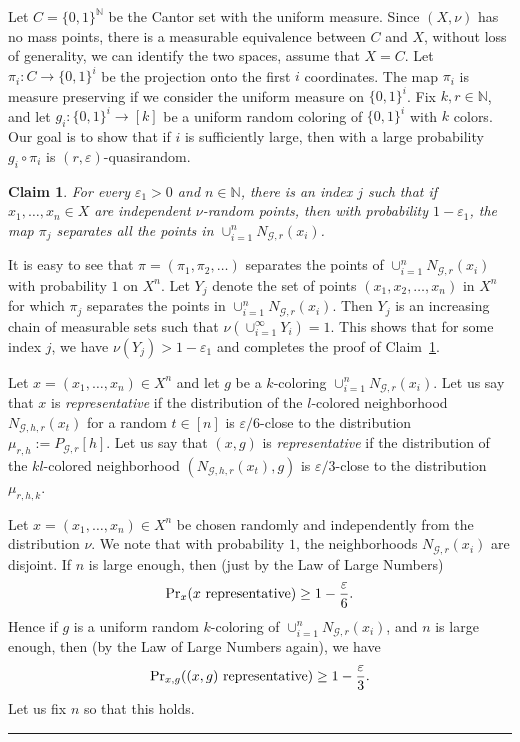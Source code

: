 \documentclass{article}
\newtheorem{claim}{Claim}
\newenvironment{proof}{{\bf Proof.}}{\hfill\rule{2mm}{2mm}\medskip}
\def\GG{\mathcal{G}}\def\HH{\mathcal{H}}\def\II{\mathcal{I}}
\def\eps{\varepsilon}
\def\Pr {{\rm Pr}}
\begin{document}
\begin{proof}
Let $C=\{0,1\}^\mathbb{N}$ be the Cantor set with the uniform
measure. Since $(X,\nu)$ has no mass points, there is a measurable
equivalence between $C$ and $X$, without loss of generality, we can
identify the two spaces, assume that $X=C$. Let
$\pi_i:C\rightarrow\{0,1\}^i$ be the projection onto the first $i$
coordinates. The map $\pi_i$ is measure preserving if we consider the
uniform measure on $\{0,1\}^i$. Fix $k,r\in\mathbb{N}$, and let
$g_i:\{0,1\}^i\rightarrow [k]$ be a uniform random coloring of
$\{0,1\}^i$ with $k$ colors. Our goal is to show that if $i$ is
sufficiently large, then with a large probability $g_i\circ\pi_i$ is
$(r,\eps)$-quasirandom.

\begin{claim}\label{CLAIM:QRAND}
For every $\eps_1>0$ and $n\in\mathbb{N}$, there is an index $j$ such
that if $x_1,\dots,x_n\in X$ are independent $\nu$-random points,
then with probability $1-\eps_1$, the map $\pi_j$ separates all the
points in $\cup_{i=1}^n N_{\GG,r}(x_i)$.
\end{claim}

It is easy to see that $\pi=(\pi_1,\pi_2,\dots)$ separates the points
of $\cup_{i=1}^nN_{\GG,r}(x_i)$ with probability {$1$} on $X^n$. Let
$Y_j$ denote the set of points $(x_1,x_2,\dots,x_n)$ in $X^n$ for
which $\pi_j$ separates the points in $\cup_{i=1}^n N_{\GG,r}(x_i)$.
{Then} $Y_j$ is an increasing chain of measurable sets such that
$\nu(\cup_{i=1}^\infty Y_i)=1$. This shows that for some index $j$,
we have $\nu(Y_j)>1-\eps_1$ and {completes} the proof of
Claim~\ref{CLAIM:QRAND}.

\smallskip

Let $x=(x_1,\dots,x_n)\in X^n$ and let $g$ be a $k$-coloring
$\cup_{i=1}^n N_{\GG,r}(x_i)$. Let us say that $x$ is \emph{representative} if
the
distribution of the $l$-colored neighborhood $N_{\GG,h,r}(x_t)$ for a
random $t\in[n]$ is $\eps/6$-close to the distribution $\mu_{r,h} :=
P_{\GG,r}[h]$.
Let us say that $(x,g)$ is \emph{representative} if the distribution
of the $kl$-colored neighborhood $(N_{\GG,h,r}(x_t),g)$ is
$\eps/3$-close to the distribution $\mu_{r,h,k}$.

Let $x=(x_1,\dots,x_n)\in X^n$ be chosen randomly and independently
from the distribution $\nu$. We note that with probability $1$, the
neighborhoods $N_{\GG,r}(x_i)$ are disjoint. If $n$ is large enough,
then (just by the Law of Large Numbers)
\[
\Pr_x(x~\text{representative})\ge 1-\frac\eps6.
\]
Hence if $g$ is a uniform random $k$-coloring of $\cup_{i=1}^n
N_{\GG,r}(x_i)$, and $n$ is large enough, then (by the Law of Large
Numbers again), we have
\[
\Pr_{x,g}((x,g)~\text{representative})\ge 1-\frac\eps3.
\]
Let us fix $n$ so that this holds.


\end{proof}
\end{document}
